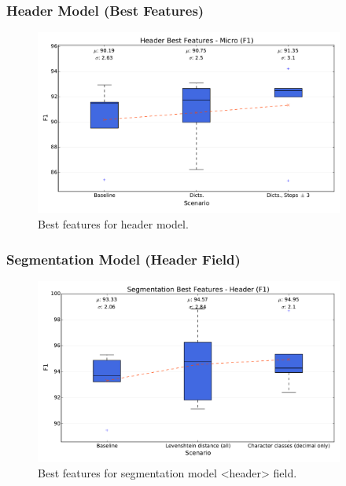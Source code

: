 \documentclass{beamer}
\begin{document}
\begin{frame}
\frametitle{Header Model (Best Features)}
\begin{figure}[h]
\center
\includegraphics[width=4in]{Figures/micro_header.pdf}
\caption{Best features for header model.}
\end{figure}
\end{frame}

%


\begin{frame}
\frametitle{Segmentation Model (Header Field)}
\begin{figure}[h]
\center
\includegraphics[width=4in]{Figures/header.pdf}
\caption{Best features for segmentation model <header> field.}
\end{figure}
\end{frame}

\end{document}
